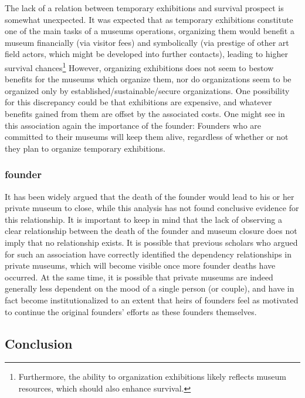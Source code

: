 \documentclass[12pt]{article}
\begin{document}
The lack of a relation between temporary exhibitions and survival prospect is somewhat unexpected.
It was expected that as temporary exhibitions constitute one of the main tasks of a museums operations, organizing them would benefit a museum financially (via visitor fees) and symbolically (via prestige of other art field actors, which might be developed into further contacts), leading to higher survival chances\footnote{Furthermore, the ability to organization exhibitions likely reflects museum resources, which should also enhance survival.}
However, organizing exhibitions does not seem to bestow benefits for the museums which organize them, nor do organizations seem to be organized only by established/sustainable/secure organizations.
One possibility for this discrepancy could be that exhibitions are expensive, and whatever benefits gained from them are offset by the associated costs.
One might see in this association again the importance of the founder:
Founders who are committed to their museums will keep them alive, regardless of whether or not they plan to organize temporary exhibitions.
\subsubsection*{founder}

It has been widely argued that the death of the founder would lead to his or her private museum to close, while this analysis has not found conclusive evidence for this relationship.
It is important to keep in mind that the lack of observing a clear relationship between the death of the founder and museum closure does not imply that no relationship exists.
It is possible that previous scholars who argued for such an association have correctly identified the dependency relationships in private museums, which will become visible once more founder deaths have occurred.
At the same time, it is possible that private museums are indeed generally less dependent on the mood of a single person (or couple), and have in fact become institutionalized to an extent that heirs of founders feel as motivated to continue the original founders' efforts as these founders themselves.
\subsection*{Conclusion}
\end{document}
